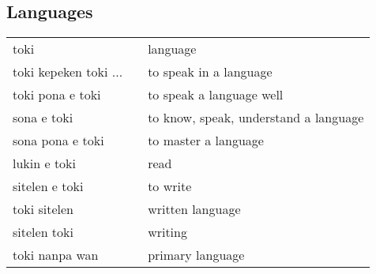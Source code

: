 \subsection{Languages}
%
\begin{supertabular}{p{4,5cm}|ll}
toki && language \\
toki kepeken toki ... && to speak in a language \\
toki pona e toki && to speak a language well \\
sona e toki && to know, speak, understand a language \\
sona pona e toki && to master a language \\
lukin e toki && read \\
sitelen e toki && to write \\
toki sitelen && written language \\
sitelen toki && writing \\
toki nanpa wan && primary language \\
\end{supertabular} \\
%
%
